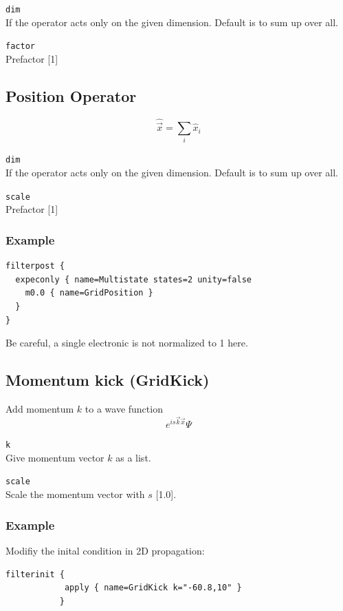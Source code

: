 \documentclass[a4paper,12pt]{scrbook}
\newcommand{\option}[2]{\item \texttt{#1}\\ #2}
\begin{document}
\begin{options}
 \option{dim}{If the operator acts only on the given dimension. Default is to sum up over all.}
  \option{factor}{Prefactor [1]}
\end{options}

\subsection{Position Operator}
\begin{equation}
 \hat \vec{x} = \sum_i \hat x_i
\end{equation}

\begin{options}
 \option{dim}{If the operator acts only on the given dimension. Default is to sum up over all.}
  \option{scale}{Prefactor [1]}
\end{options}

\subsubsection*{Example}
\begin{verbatim}
filterpost {
  expeconly { name=Multistate states=2 unity=false
    m0.0 { name=GridPosition }
  }
}
\end{verbatim}
Be careful, a single electronic is not normalized to 1 here.

\subsection{Momentum kick (GridKick)}
Add momentum $k$ to a wave function
\begin{equation}
 e^{i s \vec{k} \vec{x}} \Psi
\end{equation}
\begin{options}
 \option{k}{Give momentum vector $k$ as a list.}
 \option{scale}{Scale the momentum vector with $s$ [1.0].}
\end{options}

\subsubsection*{Example}
Modifiy the inital condition in 2D propagation:
\begin{verbatim}
filterinit {
            apply { name=GridKick k="-60.8,10" }
           }
\end{verbatim}
\end{document}
